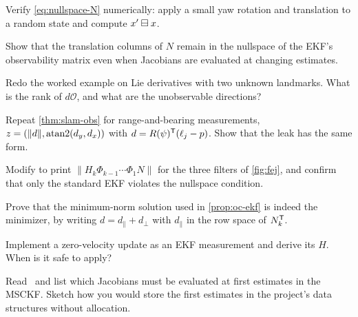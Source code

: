 \begin{exercises}
  \item Verify \eqref{eq:nullspace-N} numerically: apply a small yaw rotation and translation to a random state and compute
        $x'\boxminus x$.
  \item Show that the translation columns of $N$ remain in the nullspace of the EKF's observability matrix even when Jacobians are
        evaluated at changing estimates.
  \item Redo the worked example on Lie derivatives with two unknown landmarks. What is the rank of $d\mathcal{O}$, and what are the unobservable
        directions?
  \item Repeat \cref{thm:slam-obs} for range-and-bearing measurements, $z = (\|d\|, \operatorname{atan2}(d_y, d_x))$ with $d = R(\psi)^{\mathsf{T}}(\ell_j - p)$. Show that the leak
        has the same form.
  \item Modify  to print $\|H_k\Phi_{k-1}\cdots\Phi_1N\|$ for the three filters of \cref{fig:fej}, and confirm that only the
        standard EKF violates the nullspace condition.
  \item Prove that the minimum-norm solution used in \cref{prop:oc-ekf} is indeed the minimizer, by writing $d = d_\parallel + d_\perp$ with $d_\parallel$ in the row space of
        $N_k^{\mathsf{T}}$.
  \item Implement a zero-velocity update as an EKF measurement and derive its $H$. When is it safe to apply?
  \item Read~\cite{li2013msckf2} and list which Jacobians must be evaluated at first estimates in the MSCKF. Sketch how you would store
        the first estimates in the project's data structures without allocation.
\end{exercises}


